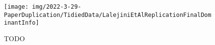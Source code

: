 \begin{figure}
    \centering
    \texttt{[image: img/2022-3-29-PaperDuplication/TidiedData/LalejiniEtAlReplicationFinalDominantInfo]}
    \caption{TODO} \label{fig:LalejiniEtAlReplicationFinalDominantInfo}
\end{figure}
